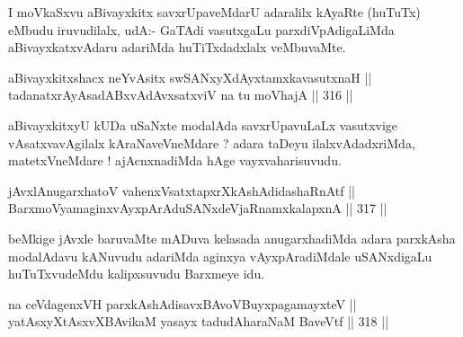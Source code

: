 \begin{artha}
I moVkaSxvu aBivayxkitx savxrUpaveMdarU adaralilx kAyaRte (huTuTx)
eMbudu iruvudilalx, udA:- GaTAdi vasutxgaLu parxdiVpAdigaLiMda
aBivayxkatxvAdaru adariMda huTiTxdadxlalx veMbuvaMte.
\end{artha}


\begin{shl}
\footnotemark[1]aBivayxkitxshacx neYvAsitx swSANxyXdAyxtamxkavasutxnaH || \\
tadanatxrAyAsadABxvAdAvxsatxviV na tu moVhajA \hfill || 316 ||  
\end{shl}

\begin{artha}
aBivayxkitxyU kUDa uSaNxte modalAda savxrUpavuLaLx
vasutxvige vAsatxvavAgilalx kAraNaveVneMdare ? adara taDeyu
ilalxvAdadxriMda, matetxVneMdare ! ajAcnxnadiMda hAge
vayxvaharisuvudu.
\end{artha}

\begin{shl}
jAvxlAnugarxhatoV vahenxVsatxtapxrXkAshAdidashaRnAtf || \\
BarxmoV\s yamaginxvAyxpArAduSANxdeVjaRnamxkalapxnA \hfill || 317 ||  
\end{shl}

\begin{artha}
beMkige jAvxle baruvaMte mADuva kelasada anugarxhadiMda adara
parxkAsha modalAdavu kANuvudu adariMda aginxya vAyxpAradiMdale
uSANxdigaLu huTuTxvudeMdu kalipxsuvudu Barxmeye idu.
\end{artha}

\begin{shl}
na ceVdagenxVH parxkAshAdisavxBAvoV\s BuyxpagamayxteV || \\
yatAsxyXtAsxvXBAvikaM yasayx tadudAharaNaM BaveVtf \hfill || 318 ||  
\end{shl}


